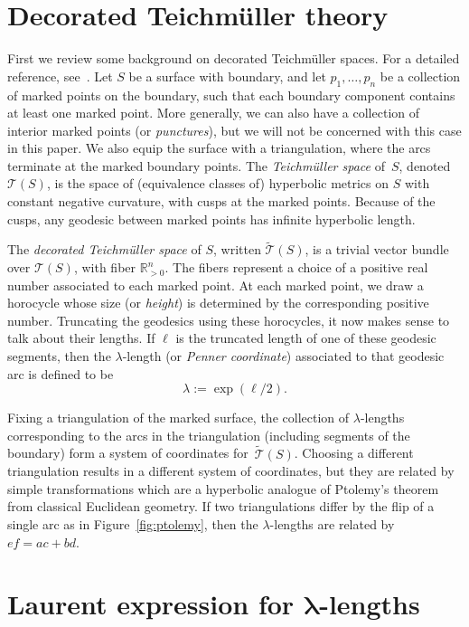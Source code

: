 \section{Decorated Teichm\"uller theory}

First we review some background on decorated Teichm\"{u}ller spaces. For a detailed reference, see~\cite{penner_12}.
%
Let $S$ be a surface with boundary, and let $p_1,\dots,p_n$ be a collection of marked points on the boundary,
such that each boundary component contains at least one marked point. More generally, we can also have a collection of interior marked points (or \emph{punctures}),
but we will not be concerned with this case in this paper. We also equip the surface with a triangulation, where the arcs terminate
at the marked boundary points. The \emph{Teichm\"{u}ller space} of~$S$, denoted~$\mathcal{T}(S)$, is the space of (equivalence classes of) hyperbolic metrics on $S$ with constant negative
curvature, with cusps at the marked points. Because of the cusps, any geodesic between marked points has infinite hyperbolic length.

The \emph{decorated Teichm\"{u}ller space} of $S$, written $\widetilde{\mathcal{T}}(S)$, is a trivial vector bundle over $\mathcal{T}(S)$,
with fiber ${\mathbb R}_{> 0}^n$. The fibers represent a choice of a positive real number associated to each marked point.
At each marked point, we draw a horocycle whose size (or \emph{height}) is determined by the corresponding positive number.
Truncating the geodesics using these horocycles, it now makes sense to talk about their lengths. If $\ell$ is the truncated
length of one of these geodesic segments, then the $\lambda$-length (or \emph{Penner coordinate}) associated to that geodesic arc
is defined to be
\[ \lambda := \exp(\ell/2). \]

Fixing a triangulation of the marked surface, the collection of $\lambda$-lengths corresponding to the arcs in the triangulation (including segments
of the boundary) form a system of coordinates for~$\widetilde{\mathcal{T}}(S)$. Choosing a different triangulation results in a different
system of coordinates, but they are related by simple transformations which are a hyperbolic analogue of Ptolemy's theorem from classical Euclidean geometry.
If two triangulations differ by the flip of a single arc as in Figure~\ref{fig:ptolemy},
then the $\lambda$-lengths are related by $ef = ac + bd$.



\section[Laurent expression for lambda-lengths]{Laurent expression for $\boldsymbol{\lambda}$-lengths}


